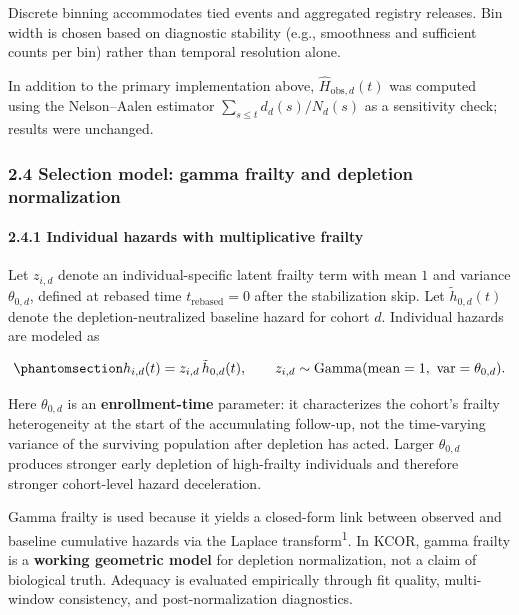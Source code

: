 \documentclass[
]{article}
\begin{document}
Discrete binning accommodates tied events and aggregated registry
releases. Bin width is chosen based on diagnostic stability (e.g.,
smoothness and sufficient counts per bin) rather than temporal
resolution alone.

In addition to the primary implementation above,
\(\hat H_{\mathrm{obs},d}(t)\) was computed using the Nelson--Aalen
estimator \(\sum_{s \le t} d_d(s)/N_d(s)\) as a sensitivity check;
results were unchanged.

\subsubsection{2.4 Selection model: gamma frailty and depletion
normalization}\label{selection-model-gamma-frailty-and-depletion-normalization}

\paragraph{2.4.1 Individual hazards with multiplicative
frailty}\label{individual-hazards-with-multiplicative-frailty}

Let \(z_{i,d}\) denote an individual-specific latent frailty term with
mean \(1\) and variance \(\theta_{0,d}\), defined at rebased time
\(t_{\mathrm{rebased}}=0\) after the stabilization skip. Let
\(\tilde h_{0,d}(t)\) denote the depletion-neutralized baseline hazard
for cohort \(d\). Individual hazards are modeled as

\begin{equation}\protect\phantomsection\label{eq:individual-hazard-frailty}{
h_{i,d}(t) = z_{i,d}\,\tilde h_{0,d}(t),
\qquad
z_{i,d} \sim \mathrm{Gamma}(\mathrm{mean}=1,\ \mathrm{var}=\theta_{0,d}).
}\end{equation}

Here \(\theta_{0,d}\) is an \textbf{enrollment-time} parameter: it
characterizes the cohort's frailty heterogeneity at the start of the
accumulating follow-up, not the time-varying variance of the surviving
population after depletion has acted. Larger \(\theta_{0,d}\) produces
stronger early depletion of high-frailty individuals and therefore
stronger cohort-level hazard deceleration.

Gamma frailty is used because it yields a closed-form link between
observed and baseline cumulative hazards via the Laplace
transform\textsuperscript{1}. In KCOR, gamma frailty is a
\textbf{working geometric model} for depletion normalization, not a
claim of biological truth. Adequacy is evaluated empirically through fit
quality, multi-window consistency, and post-normalization diagnostics.
\end{document}

